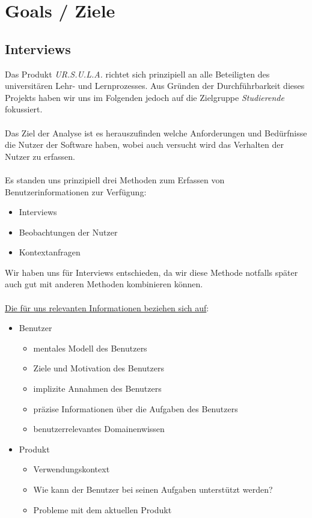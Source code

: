 \documentclass{article}
\begin{document}
\newpage

\section{Goals / Ziele}

\subsection{Interviews}

Das Produkt \textit{UR.S.U.L.A.} richtet sich prinzipiell an alle Beteiligten des universitären Lehr- und Lernprozesses. Aus Gründen der Durchführbarkeit dieses Projekts haben wir uns im Folgenden jedoch auf die Zielgruppe \textit{Studierende} fokussiert.\\
\\
Das Ziel der Analyse ist es herauszufinden welche Anforderungen und Bedürfnisse die Nutzer der Software haben, wobei auch versucht wird das Verhalten der Nutzer zu erfassen.\\
\\
Es standen uns prinzipiell drei Methoden zum Erfassen von Benutzerinformationen zur Verfügung:
\begin{itemize}
\item Interviews
\item Beobachtungen der Nutzer
\item Kontextanfragen
\end{itemize}
Wir haben uns für Interviews entschieden, da wir diese Methode notfalls später auch gut mit anderen Methoden kombinieren können.\\
\\
\underline{Die für uns relevanten Informationen beziehen sich auf}:
\begin{itemize}
\item Benutzer
	\begin{itemize}
	\item mentales Modell des Benutzers
	\item Ziele und Motivation des Benutzers
	\item implizite Annahmen des Benutzers
	\item präzise Informationen über die Aufgaben des Benutzers
	\item benutzerrelevantes Domainenwissen
	\end{itemize}
\item Produkt
	\begin{itemize}
	\item Verwendungskontext
	\item Wie kann der Benutzer bei seinen Aufgaben unterstützt werden?
	\item Probleme mit dem aktuellen Produkt
	\end{itemize}
\end{itemize}
\end{document}
